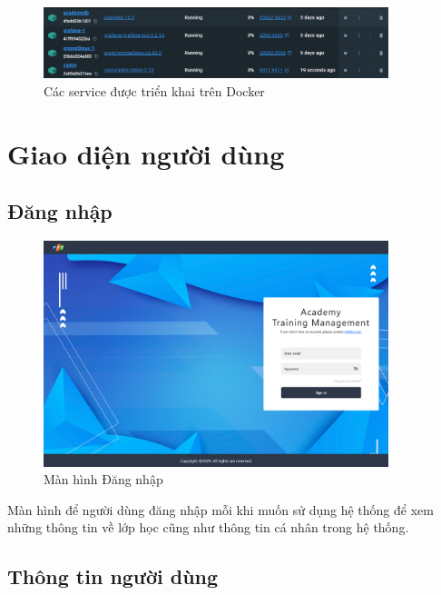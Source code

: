 \documentclass[report.tex]{subfiles}
\begin{document}
\begin{figure}[!htb]
{\centering
\includegraphics[width=380px]{../meta/ui.docker-compose.png}
\caption{Các service được triển khai trên Docker}
\par
}
\end{figure}
\FloatBarrier

\section{Giao diện người dùng}

\subsection{Đăng nhập}

\begin{figure}[!htb]
{\centering
\includegraphics[width=380px]{../meta/ui.login.png}
\caption{Màn hình Đăng nhập}
\par
}
\end{figure}
\FloatBarrier

Màn hình để người dùng đăng nhập mỗi khi muốn sử dụng hệ thống để
xem những thông tin về lớp học cũng như thông tin cá nhân trong hệ thống.

\subsection{Thông tin người dùng}
\end{document}
